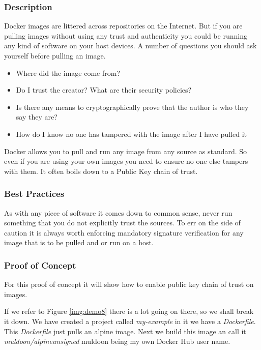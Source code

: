 \subsubsection{Description}
Docker images are littered across repositories on the Internet. But if you are pulling images without using any trust and authenticity you could be running any kind of software on your host devices. A number of questions you should ask yourself before pulling an image.
\begin{itemize}
    \item Where did the image come from?
    \item Do I trust the creator? What are their security policies?
    \item Is there any means to cryptographically prove that the author is who they say they are?
    \item How do I know no one has tampered with the image after I have pulled it
\end{itemize}
Docker allows you to pull and run any image from any source as standard. So even if you are using your own images you need to ensure no one else tampers with them. It often boils down to a Public Key chain of trust.
\subsubsection{Best Practices}
As with any piece of software it comes down to common sense, never run something that you do not explicitly trust the sources. To err on the side of caution it is always worth enforcing mandatory signature verification for any image that is to be pulled and or run on a host.
\subsubsection{Proof of Concept}
For this proof of concept it will show how to enable public key chain of trust on images.

If we refer to Figure \ref{img:demo8} there is a lot going on there, so we shall break it down. We have created a project called \textit{my-example} in it we have a \textit{Dockerfile}. This \textit{Dockerfile} just pulls an alpine image. Next we build this image an call it \textit{muldoon/alpineunsigned} muldoon being my own Docker Hub user name.

